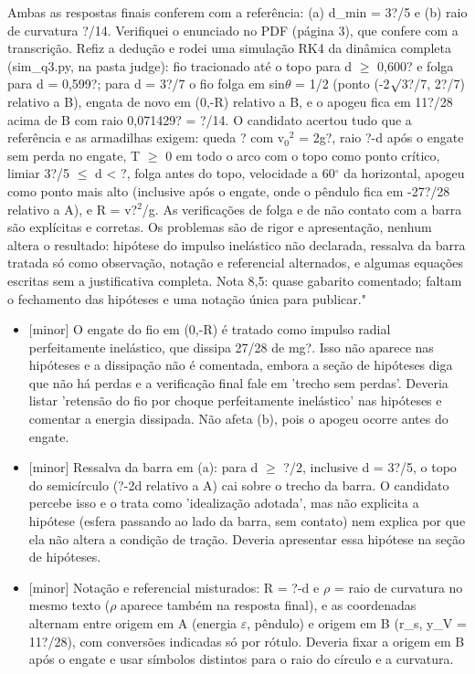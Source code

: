 \documentclass{article}%
\begin{document}
Ambas as respostas finais conferem com a referência: (a) d\_min = 3?/5 e (b) raio de curvatura ?/14. Verifiquei o enunciado no PDF (página 3), que confere com a transcrição. Refiz a dedução e rodei uma simulação RK4 da dinâmica completa (sim\_q3.py, na pasta judge): fio tracionado até o topo para d $\geq$ 0,600? e folga para d = 0,599?; para d = 3?/7 o fio folga em sin$\theta$ = 1/2 (ponto (-2$\surd$3?/7, 2?/7) relativo a B), engata de novo em (0,-R) relativo a B, e o apogeu fica em 11?/28 acima de B com raio 0,071429? = ?/14. O candidato acertou tudo que a referência e as armadilhas exigem: queda ? com v$_{0}$$^2$ = 2g?, raio ?-d após o engate sem perda no engate, T $\geq$ 0 em todo o arco com o topo como ponto crítico, limiar 3?/5 $\leq$ d < ?, folga antes do topo, velocidade a 60$^\circ$ da horizontal, apogeu como ponto mais alto (inclusive após o engate, onde o pêndulo fica em -27?/28 relativo a A), e R = v?$^2$/g. As verificações de folga e de não contato com a barra são explícitas e corretas. Os problemas são de rigor e apresentação, nenhum altera o resultado: hipótese do impulso inelástico não declarada, ressalva da barra tratada só como observação, notação e referencial alternados, e algumas equações escritas sem a justificativa completa. Nota 8,5: quase gabarito comentado; faltam o fechamento das hipóteses e uma notação única para publicar."%
\begin{itemize}%
\item%
{[}minor{]} O engate do fio em (0,-R) é tratado como impulso radial perfeitamente inelástico, que dissipa 27/28 de mg?. Isso não aparece nas hipóteses e a dissipação não é comentada, embora a seção de hipóteses diga que não há perdas e a verificação final fale em 'trecho sem perdas'. Deveria listar 'retensão do fio por choque perfeitamente inelástico' nas hipóteses e comentar a energia dissipada. Não afeta (b), pois o apogeu ocorre antes do engate.%
\item%
{[}minor{]} Ressalva da barra em (a): para d $\geq$ ?/2, inclusive d = 3?/5, o topo do semicírculo (?-2d relativo a A) cai sobre o trecho da barra. O candidato percebe isso e o trata como 'idealização adotada', mas não explicita a hipótese (esfera passando ao lado da barra, sem contato) nem explica por que ela não altera a condição de tração. Deveria apresentar essa hipótese na seção de hipóteses.%
\item%
{[}minor{]} Notação e referencial misturados: R = ?-d e $\rho$ = raio de curvatura no mesmo texto ($\rho$ aparece também na resposta final), e as coordenadas alternam entre origem em A (energia $\varepsilon$, pêndulo) e origem em B (r\_s, y\_V = 11?/28), com conversões indicadas só por rótulo. Deveria fixar a origem em B após o engate e usar símbolos distintos para o raio do círculo e a curvatura.%

\end{itemize}$$
\end{document}
